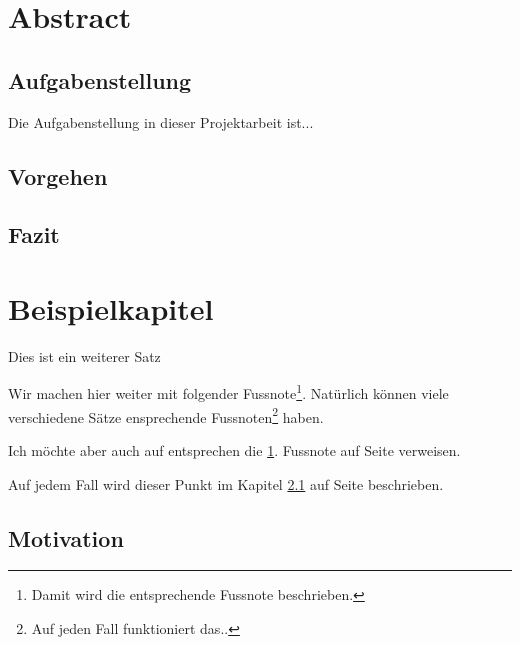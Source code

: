 \documentclass[a4paper,12pt]{article}
\begin{document}
\newpage
\tableofcontents
\listoffigures

\newpage
\section{Abstract}
\subsection{Aufgabenstellung}
Die Aufgabenstellung in dieser Projektarbeit ist...
\subsection{Vorgehen}
\subsection{Fazit}



\newpage
\section{Beispielkapitel}
Dies ist ein weiterer Satz

Wir machen hier weiter mit folgender Fussnote\footnote{\label{foot:nonce1}Damit wird die entsprechende Fussnote beschrieben.}.
Natürlich können viele verschiedene Sätze ensprechende Fussnoten\footnote{\label{foot:nonce2}Auf jeden Fall funktioniert das..} haben.

Ich möchte aber auch auf entsprechen die \ref{foot:nonce1}. Fussnote auf Seite \pageref{foot:nonce1} verweisen.

Auf jedem Fall wird dieser Punkt im Kapitel \ref{subsec:Motivation} auf Seite \pageref{sec:Einleitung} beschrieben.

\subsection{Motivation}
\label{subsec:Motivation}
\end{document}
